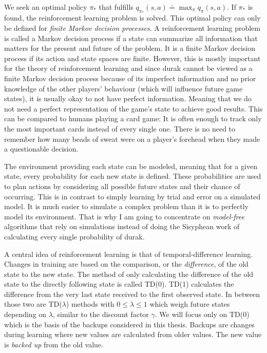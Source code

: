 \documentclass[a4paper,titlepage]{article}
\begin{document}
We seek an optimal policy $\pi_*$ that fulfills $q_{\pi_*}(s, a) \doteq \max_\pi q_\pi(s, a)$. If $\pi_*$ is found, the reinforcement learning problem is solved. This optimal policy can only be defined for \emph{finite Markov decision processes}. A reinforcement learning problem is called a Markov decision process if a state can summarize all information that matters for the present and future of the problem. It is a finite Markov decision process if its action and state spaces are finite. However, this is mostly important for the theory of reinforcement learning and since durak cannot be viewed as a finite Markov decision process because of its imperfect information and no prior knowledge of the other players' behaviour (which will influence future game states), it is usually okay to not have perfect information. Meaning that we do not need a perfect representation of the game's state to achieve good results. This can be compared to humans playing a card game: It is often enough to track only the most important cards instead of every single one. There is no need to remember how many beads of sweat were on a player's forehead when they made a questionable decision. \medskip

The environment providing each state can be modeled, meaning that for a given state, every probability for each new state is defined. These probabilities are used to plan actions by considering all possible future states and their chance of occurring. This is in contrast to simply learning by trial and error on a simulated model. It is much easier to simulate a complex problem than it is to perfectly model its environment. That is why I am going to concentrate on \emph{model-free} algorithms that rely on simulations instead of doing the Sisyphean work of calculating every single probability of durak.

A central idea of reinforcement learning is that of temporal-difference learning. Changes in training are based on the comparison, or the \emph{difference}, of the old state to the new state. The method of only calculating the difference of the old state to the directly following state is called TD(0). TD(1) calculates the difference from the very last state received to the first observed state. In between those two are TD($\lambda$) methods with $0 \leq \lambda \leq 1$ which weigh future states depending on $\lambda$, similar to the discount factor $\gamma$. We will focus only on TD(0) which is the basis of the backups considered in this thesis. Backups are changes during learning where new values are calculated from older values. The new value is \emph{backed up} from the old value.
\end{document}
